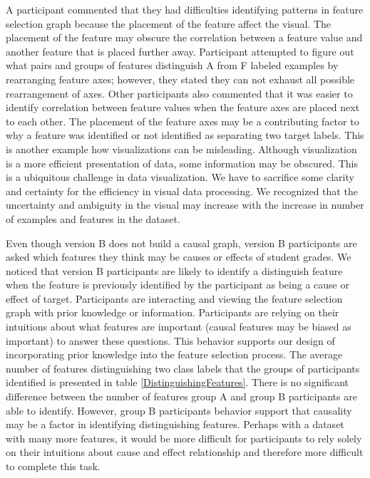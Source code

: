 A participant commented that they had difficulties identifying patterns in feature selection graph because the placement of the feature affect the visual. The placement of the feature may obscure the correlation between a feature value and another feature that is placed further away. Participant attempted to figure out what pairs and groups of features distinguish A from F labeled examples by rearranging feature axes; however, they stated they can not exhaust all possible rearrangement of axes. Other participants also commented that it was easier to identify correlation between feature values when the feature axes are placed next to each other. The placement of the feature axes may be a contributing factor to why a feature was identified or not identified as separating two target labels. This is another example how visualizations can be misleading. Although visualization is a more efficient presentation of data, some information may be obscured. This is a ubiquitous challenge in data visualization. We have to sacrifice some clarity and certainty for the efficiency in visual data processing. We recognized that the uncertainty and ambiguity in the visual may increase with the increase in number of examples and features in the dataset.

Even though version B does not build a causal graph, version B participants are asked which features they think may be causes or effects of student grades. We noticed that version B participants are likely to identify a distinguish feature when the feature is previously identified by the participant as being a cause or effect of target. Participants are interacting and viewing the feature selection graph with prior knowledge or information. Participants are relying on their intuitions about what features are important (causal features may be biased as important) to answer these questions. This behavior supports our design of incorporating prior knowledge into the feature selection process. The average number of features distinguishing two class labels that the groups of participants identified is presented in table \ref{DistinguishingFeatures}. There is no significant difference between the number of features group A and group B participants are able to identify. However, group B participants behavior support that causality may be a factor in identifying distinguishing features. Perhaps with a dataset with many more features, it would be more difficult for participants to rely solely on their intuitions about cause and effect relationship and therefore more difficult to complete this task.

